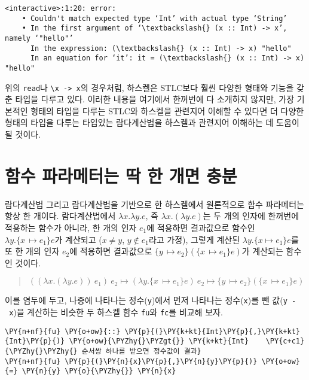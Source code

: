     \begin{Verbatim}[commandchars=\\\{\}, frame=single, framerule=1mm, rulecolor=\color{outerrorbackground}]
<interactive>:1:20: error:
    • Couldn't match expected type ‘Int’ with actual type ‘String’
    • In the first argument of ‘\textbackslash{} (x :: Int) -> x’, namely ‘"hello"’
      In the expression: (\textbackslash{} (x :: Int) -> x) "hello"
      In an equation for ‘it’: it = (\textbackslash{} (x :: Int) -> x) "hello"
    \end{Verbatim}

    위의 \texttt{read}나 \texttt{\textbackslash{}x\ -\textgreater{}\ x}의
경우처럼, 하스켈은 STLC보다 훨씬 다양한 형태와 기능을 갖춘 타입을 다루고
있다. 이러한 내용을 여기에서 한꺼번에 다 소개하지 않지만, 가장 기본적인
형태의 타입을 다루는 STLC와 하스켈을 관련지어 이해할 수 있다면 더 다양한
형태의 타입을 다루는 타입있는 람다계산법을 하스켈과 관련지어 이해하는 데
도움이 될 것이다.

    \hypertarget{uxd568uxc218-uxd30cuxb77cuxba54uxd130uxb294-uxb531-uxd55c-uxac1cuxba74-uxcda9uxbd84}{%
\section{함수 파라메터는 딱 한 개면
충분}\label{uxd568uxc218-uxd30cuxb77cuxba54uxd130uxb294-uxb531-uxd55c-uxac1cuxba74-uxcda9uxbd84}}

람다계산법 그리고 람다계산법을 기반으로 한 하스켈에서 원론적으로 함수
파라메터는 항상 한 개이다. 람다계산법에서 \(\lambda x.\lambda y.e\), 즉
\(\lambda x.(\lambda y.e)\)는 두 개의 인자에 한꺼번에 적용하는 함수가
아니라, 한 개의 인자 \(e_1\)에 적용하면 결과값으로 함수인
\(\lambda y.\{x{\,\mapsto}e_1\}e\)가 계산되고 (\(x\neq y\),
\(y\notin e_1\)라고 가정), 그렇게 계산된
\(\lambda y.\{x{\mapsto}e_1\}e\)를 또 한 개의 인자 \(e_2\)에 적용하면
결과값으로 \(\{y{\,\mapsto}e_2\}(\{x{\,\mapsto}e_1\}e)\)가 계산되는
함수인 것이다.
\begin{quote}
    \(((\lambda x.(\lambda y.e))~e_1)~e_2 \longmapsto (\lambda y.\{x{\,\mapsto}e_1\}e)~e_2 \longmapsto \{y{\,\mapsto}e_2\}(\{x{\,\mapsto}e_1\}e)\)
\end{quote}
    이를 염두에 두고, 나중에 나타나는 정수(\texttt{y})에서 먼저 나타나는
정수(\texttt{x})를 뺀 값(\texttt{y\ -\ x})을 계산하는 비슷한 두 하스켈
함수 \texttt{fu}와 \texttt{fc}를 비교해 보자.

    \begin{tcolorbox}[breakable, size=fbox, boxrule=1pt, pad at break*=1mm,colback=cellbackground, colframe=cellborder, top=.75ex]
\begin{Verbatim}[commandchars=\\\{\}]
\PY{n+nf}{fu} \PY{o+ow}{::} \PY{p}{(}\PY{k+kt}{Int}\PY{p}{,}\PY{k+kt}{Int}\PY{p}{)} \PY{o+ow}{\PYZhy{}\PYZgt{}} \PY{k+kt}{Int}    \PY{c+c1}{\PYZhy{}\PYZhy{} 순서쌍 하나를 받으면 정수값이 결과}
\PY{n+nf}{fu} \PY{p}{(}\PY{n}{x}\PY{p}{,}\PY{n}{y}\PY{p}{)} \PY{o+ow}{=} \PY{n}{y} \PY{o}{\PYZhy{}} \PY{n}{x}
\end{Verbatim}
\end{tcolorbox}

